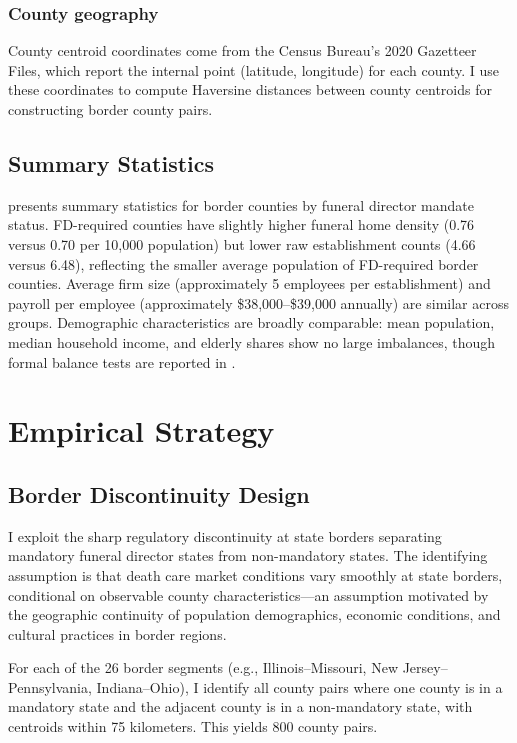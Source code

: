 \documentclass[12pt]{article}
\begin{document}
\subsubsection*{County geography} County centroid coordinates come from the Census Bureau's 2020 Gazetteer Files, which report the internal point (latitude, longitude) for each county. I use these coordinates to compute Haversine distances between county centroids for constructing border county pairs.

\subsection{Summary Statistics}



 presents summary statistics for border counties by funeral director mandate status. FD-required counties have slightly higher funeral home density (0.76 versus 0.70 per 10,000 population) but lower raw establishment counts (4.66 versus 6.48), reflecting the smaller average population of FD-required border counties. Average firm size (approximately 5 employees per establishment) and payroll per employee (approximately \$38,000--\$39,000 annually) are similar across groups. Demographic characteristics are broadly comparable: mean population, median household income, and elderly shares show no large imbalances, though formal balance tests are reported in .


\section{Empirical Strategy}

\subsection{Border Discontinuity Design}

I exploit the sharp regulatory discontinuity at state borders separating mandatory funeral director states from non-mandatory states. The identifying assumption is that death care market conditions vary smoothly at state borders, conditional on observable county characteristics---an assumption motivated by the geographic continuity of population demographics, economic conditions, and cultural practices in border regions.

For each of the 26 border segments (e.g., Illinois--Missouri, New Jersey--Pennsylvania, Indiana--Ohio), I identify all county pairs where one county is in a mandatory state and the adjacent county is in a non-mandatory state, with centroids within 75 kilometers. This yields 800 county pairs.
\end{document}
